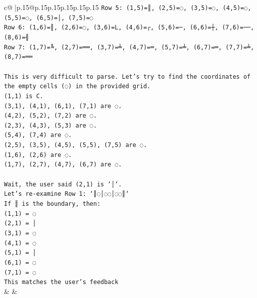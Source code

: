 \documentclass{article}
\begin{document}
{\begin{supertabular}{c@{$\;$}|p{.15\linewidth}@{}p{.15\linewidth}p{.15\linewidth}p{.15\linewidth}p{.15\linewidth}p{.15\linewidth}}
{{{\texttt{Row 5: (1,5)=║, (2,5)=◌, (3,5)=◌, (4,5)=◌, (5,5)=◌, (6,5)=│, (7,5)=◌} \\
\texttt{Row 6: (1,6)=║, (2,6)=◌, (3,6)=L, (4,6)=┌, (5,6)=─, (6,6)=┼, (7,6)=──, (8,6)=╢} \\
\texttt{Row 7: (1,7)=╚, (2,7)=══, (3,7)=╧, (4,7)=═, (5,7)=╧, (6,7)=═, (7,7)=╧, (8,7)=══} \\
\\ 
\texttt{This is very difficult to parse. Let's try to find the coordinates of the empty cells (◌) in the provided grid.} \\
\texttt{(1,1) is C.} \\
\texttt{(3,1), (4,1), (6,1), (7,1) are ◌.} \\
\texttt{(4,2), (5,2), (7,2) are ◌.} \\
\texttt{(2,3), (4,3), (5,3) are ◌.} \\
\texttt{(5,4), (7,4) are ◌.} \\
\texttt{(2,5), (3,5), (4,5), (5,5), (7,5) are ◌.} \\
\texttt{(1,6), (2,6) are ◌.} \\
\texttt{(1,7), (2,7), (4,7), (6,7) are ◌.} \\
\\ 
\texttt{Wait, the user said (2,1) is `│`.} \\
\texttt{Let's re{-}examine Row 1: `║◌│◌◌│◌◌║`} \\
\texttt{If ║ is the boundary, then:} \\
\texttt{(1,1) = ◌} \\
\texttt{(2,1) = │} \\
\texttt{(3,1) = ◌} \\
\texttt{(4,1) = ◌} \\
\texttt{(5,1) = │} \\
\texttt{(6,1) = ◌} \\
\texttt{(7,1) = ◌} \\
\texttt{This matches the user's feedback} \\
            }
        }
    }
    & & \\ \\


\end{supertabular}}
\end{document}
